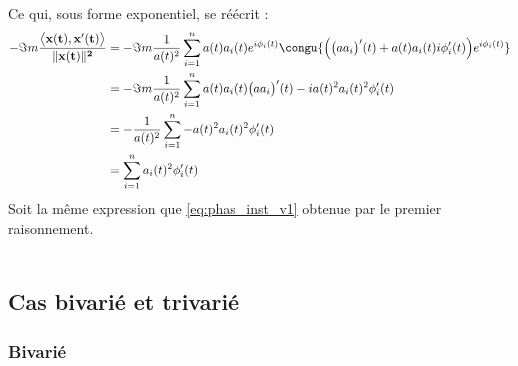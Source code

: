 \\
Ce qui, sous forme exponentiel, se réécrit :
\begin{align*}
	-\Im m\frac{\big\langle \bf{x}(t) , \bf{x}'(t) \big\rangle}{\|\bf{x}(t)\|^2} &= -\Im m\frac{1}{a(t)^2} \sum_{i=1}^n a(t)a_i(t)e^{i\phi_i(t)}\congu{\Big( \big(aa_i\big)'(t) +a(t)a_i(t)i\phi_i'(t)\Big)e^{i\phi_i(t)}} \\
	&= -\Im m\frac{1}{a(t)^2} \sum_{i=1}^n a(t)a_i(t)\big(aa_i\big)'(t) -ia(t)^2a_i(t)^2\phi_i'(t) \\
	&= -\frac{1}{a(t)^2} \sum_{i=1}^n -a(t)^2a_i(t)^2 \phi_i'(t) \\
	&= \sum_{i=1}^n a_i(t)^2 \phi_i'(t)
\end{align*}
Soit la même expression que \eqref{eq:phas_inst_v1} obtenue par le premier raisonnement.
\\ \\


\subsection{Cas bivarié et trivarié}

\subsubsection{Bivarié}

